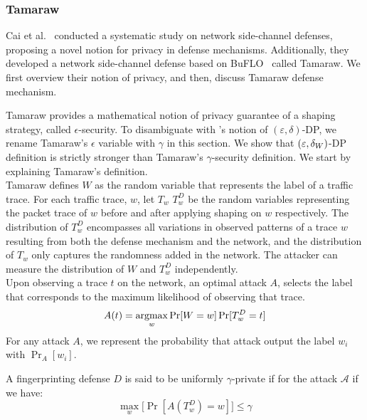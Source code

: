 \subsubsection{Tamaraw}\label{subsubsec:tamaraw}
Cai et al.~\cite{cai2014systematic} conducted a systematic study on network side-channel defenses, proposing a novel notion for privacy in defense mechanisms.
Additionally, they developed a network side-channel defense based on BuFLO~\cite{dyer2012peek} called Tamaraw. 
We first overview their notion of privacy, and then, discuss Tamaraw defense mechanism.


Tamaraw \cite{cai2014tamaraw} provides a
mathematical notion of privacy guarantee of a shaping strategy, called $\epsilon$-security.
To disambiguate with {\sys}'s notion of $(\varepsilon, \delta)$-DP, we rename Tamaraw's $\epsilon$ variable with $\gamma$ in this section.
We show that $(\varepsilon, \delta_{W})$-DP definition is strictly stronger than Tamaraw's $\gamma$-security definition.
We start by explaining Tamaraw's definition.
\\
\noindent
Tamaraw defines $W$ as the random variable that represents the label of a
traffic trace.
For each traffic trace, $w$, let $T_{w}$ $T_{w}^{D}$ be the random variables representing
the packet trace of $w$ before and after applying shaping on $w$ respectively.
The distribution of $T_{w}^D$ encompasses all variations in observed
patterns of a trace $w$ resulting from both the defense mechanism and the
network, and the distribution of $T_{w}$ only captures the randomness added in the network.
The attacker can measure the distribution of $W$ and $T_{w}^{D}$ independently.
\\
\noindent
Upon observing a trace $t$ on the network, an optimal attack $A$, selects the
label that corresponds to the maximum likelihood of observing that trace.
\begin{equation*}
  A(t) = \operatorname*{argmax}_{w}{\Pr[W=w]\Pr[T_{w}^{D}=t]}
\end{equation*}
For any attack $A$, we represent the probability that attack output the label $w_i$ with $\Pr_A[w_i]$.
\begin{definition}
  A fingerprinting defense $D$ is said to be uniformly $\gamma$-private if for the attack $\mathcal{A}$ if we have:
  \begin{equation*}
    \max_w\big[\Pr[A(T_w^D)=w]\big] \leq \gamma
  \end{equation*}
\end{definition}

